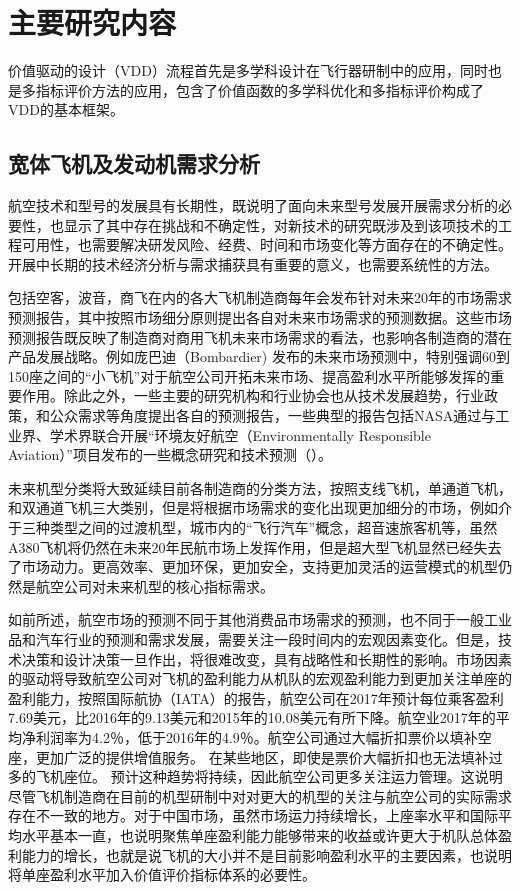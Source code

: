 \documentclass[12pt,a4paper]{report}
\begin{document}
\chapter{主要研究内容}

价值驱动的设计（VDD）流程首先是多学科设计在飞行器研制中的应用，同时也是多指标评价方法的应用，包含了价值函数的多学科优化和多指标评价构成了VDD的基本框架。

\section{宽体飞机及发动机需求分析}

航空技术和型号的发展具有长期性，既说明了面向未来型号发展开展需求分析的必要性，也显示了其中存在挑战和不确定性，对新技术的研究既涉及到该项技术的工程可用性，也需要解决研发风险、经费、时间和市场变化等方面存在的不确定性。开展中长期的技术经济分析与需求捕获具有重要的意义，也需要系统性的方法。

包括空客\cite{Airbusgmf}，波音\cite{Boeingcmo}，商飞\cite{comacmf}在内的各大飞机制造商每年会发布针对未来20年的市场需求预测报告，其中按照市场细分原则提出各自对未来市场需求的预测数据。这些市场预测报告既反映了制造商对商用飞机未来市场需求的看法，也影响各制造商的潜在产品发展战略。例如庞巴迪（Bombardier) 发布的未来市场预测中\cite{bombardier}，特别强调60到150座之间的“小飞机”对于航空公司开拓未来市场、提高盈利水平所能够发挥的重要作用。除此之外，一些主要的研究机构和行业协会也从技术发展趋势，行业政策，和公众需求等角度提出各自的预测报告，一些典型的报告包括NASA通过与工业界、学术界联合开展“环境友好航空（Environmentally Responsible Aviation）”项目发布的一些概念研究和技术预测（\cite{nasa, nasa2}）。

未来机型分类将大致延续目前各制造商的分类方法，按照支线飞机，单通道飞机，和双通道飞机三大类别，但是将根据市场需求的变化出现更加细分的市场，例如介于三种类型之间的过渡机型，城市内的“飞行汽车”概念，超音速旅客机等，虽然A380飞机将仍然在未来20年民航市场上发挥作用，但是超大型飞机显然已经失去了市场动力。更高效率、更加环保，更加安全，支持更加灵活的运营模式的机型仍然是航空公司对未来机型的核心指标需求。

如前所述，航空市场的预测不同于其他消费品市场需求的预测，也不同于一般工业品和汽车行业的预测和需求发展，需要关注一段时间内的宏观因素变化。但是，技术决策和设计决策一旦作出，将很难改变，具有战略性和长期性的影响。市场因素的驱动将导致航空公司对飞机的盈利能力从机队的宏观盈利能力到更加关注单座的盈利能力，按照国际航协（IATA）的报告\cite{iata}，航空公司在2017年预计每位乘客盈利7.69美元，比2016年的9.13美元和2015年的10.08美元有所下降。航空业2017年的平均净利润率为4.2％，低于2016年的4.9％。航空公司通过大幅折扣票价以填补空座，更加广泛的提供增值服务。 在某些地区，即使是票价大幅折扣也无法填补过多的飞机座位。 预计这种趋势将持续，因此航空公司更多关注运力管理。这说明尽管飞机制造商在目前的机型研制中对对更大的机型的关注与航空公司的实际需求存在不一致的地方。对于中国市场，虽然市场运力持续增长，上座率水平和国际平均水平基本一直，也说明聚焦单座盈利能力能够带来的收益或许更大于机队总体盈利能力的增长，也就是说飞机的大小并不是目前影响盈利水平的主要因素，也说明将单座盈利水平加入价值评价指标体系的必要性。
\end{document}
